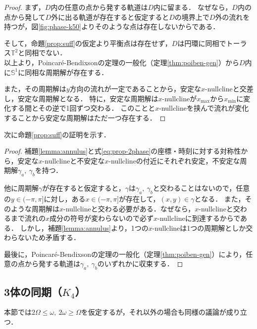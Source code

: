 \documentclass[../main]{subfiles}
\begin{document}
        \begin{proof}
            まず，$D$内の任意の点から発する軌道は$D$内に留まる．
            なぜなら，$D$内の点から発して$D$外に出る軌道が存在すると仮定すると$D$の境界上で$D$外の流れを持つが，図\ref{fig:phase-k50}よりそのような点は存在しないからである．
            
            そして，命題\ref{prop:suff}の仮定より平衡点は存在せず，$D$は円環に同相でトーラス$\mathbb{T}^2$と同相でない．\\
        以上より，Poincar\'{e}-Bendixsonの定理の一般化（定理\ref{thm:poiben-gen}）から$D$内に$\mathbb{S}^1$に同相な周期解が存在する．
        
        また，その周期解は$y$方向の流れが一定であることから，安定な$x$-nullclineと交差し，安定な周期解となる．
        特に，安定な周期解は$x$-nullclineが$x_{\max}$から$x_{\min}$に変化する間とその逆で1回ずつ交わる．
        このことと$x$-nullclineを挟んで流れが変化することから安定な周期解はただ一つ存在する．    
    \end{proof}
    次に命題\ref{prop:suff}の証明を示す．
    \begin{proof}
        補題\ref{lemma:annulus}と式\eqref{eq:prop-2phase}の座標・時刻に対する対称性から，安定な$x$-nullclineと不安定な$x$-nullclineの付近にそれぞれ安定，不安定な周期解$\gamma_a,\ \gamma_b$を持つ．

        他に周期解$\gamma$が存在すると仮定すると，$\gamma$は$\gamma_a,\ \gamma_b$と交わることはないので，任意の$y\in(-\pi,\pi]$に対し，ある$x\in(-\pi,\pi]$が存在して，$(x,y)\in\gamma$となる．
        また，そのような周期解は$x$-nullclineと交わる必要がある．なぜなら，$x$-nullclineと交わるまで流れの$x$成分の符号が変わらないので必ず$x$-nullclineに到達するからである．
        しかし，補題\ref{lemma:annulus}より，1つの$x$-nullclineは1つの周期解としか交わらないため矛盾する．

        最後に，Poincar\'{e}-Bendixsonの定理の一般化（定理\ref{thm:poiben-gen}）により，任意の点から発する軌道は$\gamma_a,\ \gamma_b$のいずれかに収束する．
    \end{proof}

    \subsection{3体の同期（$K_4$）}
    \label{sec:3body-k4}
    本節では$2\Omega\leq\omega,\ 2\omega\geq\Omega$を仮定するが，それ以外の場合も同様の議論が成り立つ．
\end{document}
